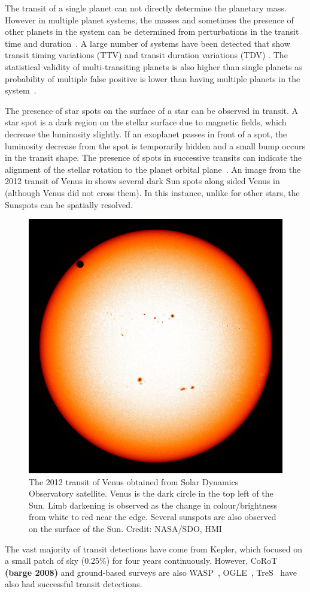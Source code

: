 The transit of a single planet can not directly determine the planetary mass.
However in multiple planet systems, the masses and sometimes the presence of other planets in the system can be determined from perturbations in the transit time and duration~\citep[e.g.][]{holman_use_2005, holman_kepler9_2010}.
A large number of systems have been detected that show transit timing variations (TTV) and transit duration variations (TDV) \citep[e.g.][]{holczer_transit_2016}.
The statistical validity of multi-transiting planets is also higher than single planets as probability of multiple false positive is lower than having multiple planets in the system~\citet{lissauer_almost_2012}.

The presence of star spots on the surface of a star can be observed in transit.
A star spot is a dark region on the stellar surface due to magnetic fields, which decrease the luminosity slightly.
If an exoplanet passes in front of a spot, the luminosity decrease from the spot is temporarily hidden and a small bump occurs in the transit shape.
The presence of spots in successive transits can indicate the alignment of the stellar rotation to the planet orbital plane~\citet{Sanchis-Ojeda et al 2012}.
An image from the 2012 transit of Venus in shows several dark Sun spots along sided Venus in  (although Venus did not cross them).
In this instance, unlike for other stars, the Sunspots can be spatially resolved.

\begin{figure}
    \centering
    \includegraphics[width=0.3\linewidth]{./figures/introduction/SDO_2012_Venus_Transit.jpg}
    \caption{The 2012 transit of Venus obtained from Solar Dynamics Observatory satellite. Venus is the dark circle in the top left of the Sun. Limb darkening is observed as the change in colour/brightness from white to red near the edge. Several sunspots are also observed on the surface of the Sun. Credit: NASA/SDO, HMI}
    \label{fig:transit_venus}
\end{figure}


The vast majority of transit detections have come from Kepler\citep{borucki_characteristics_2011}, which focused on a small patch of sky (0.25\%) for four years continuously.
However, {CoRoT} \textbf{(barge 2008)} and ground-based surveys are also WASP~\citet{pollacco_wasp_2006}, OGLE~\citep{udalski_optical_2002}, TreS~\citep{alonso_tres1_2004} have also had successful transit detections.

